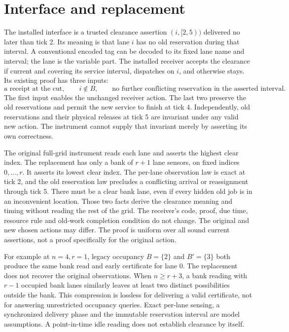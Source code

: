 \documentclass[11pt]{article}
\begin{document}
\section{Interface and replacement}
The installed interface is a trusted clearance assertion $(i,[2,5))$ delivered no later than tick 2. Its meaning is that lane $i$ has no old reservation during that interval. A conventional encoded tag can be decoded to its fixed lane name and interval; the lane is the variable part. The installed receiver accepts the clearance if current and covering its service interval, dispatches on $i$, and otherwise stays. Its existing proof has three inputs:
\[
  \text{a receipt at the cut},\qquad
  i\notin B,\qquad
  \text{no further conflicting reservation in the asserted interval}.
\]
The first input enables the unchanged receiver action. The last two preserve the old reservations and permit the new service to finish at tick 4. Independently, old reservations and their physical releases at tick 5 are invariant under any valid new action. The instrument cannot supply that invariant merely by asserting its own correctness.

The original full-grid instrument reads each lane and asserts the highest clear index. The replacement has only a bank of $r+1$ lane sensors, on fixed indices $0,\ldots,r$. It asserts its lowest clear index. The per-lane observation law is exact at tick 2, and the old reservation law precludes a conflicting arrival or reassignment through tick 5. There must be a clear bank lane, even if every hidden old job is in an inconvenient location. Those two facts derive the clearance meaning and timing without reading the rest of the grid. The receiver's code, proof, due time, resource rule and old-work completion condition do not change. The original and new chosen actions may differ. The proof is uniform over all sound current assertions, not a proof specifically for the original action.

For example at $n=4,r=1$, legacy occupancy $B=\{2\}$ and $B'=\{3\}$ both produce the same bank read and early certificate for lane 0. The replacement does not recover the original observations. When $n\ge r+3$, a bank reading with $r-1$ occupied bank lanes similarly leaves at least two distinct possibilities outside the bank. This compression is lossless for delivering a valid certificate, not for answering unrestricted occupancy queries. Exact per-lane sensing, a synchronized delivery phase and the immutable reservation interval are model assumptions. A point-in-time idle reading does not establish clearance by itself.
\end{document}
